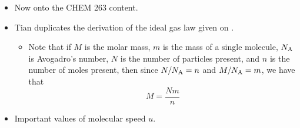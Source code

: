 \documentclass[../notes.tex]{subfiles}
\begin{document}
\begin{itemize}
\begin{itemize}
    \end{itemize}
    \item Now onto the CHEM 263 content.
    \item Tian duplicates the derivation of the ideal gas law given on \textcite[18-19]{bib:PHYS13300Notes}.
    \begin{itemize}
        \item Note that if $M$ is the molar mass, $m$ is the mass of a single molecule, $N_\text{A}$ is Avogadro's number, $N$ is the number of particles present, and $n$ is the number of moles present, then since $N/N_\text{A}=n$ and $M/N_\text{A}=m$, we have that
        \begin{equation*}
            M = \frac{Nm}{n}
        \end{equation*}
    \end{itemize}
    \item Important values of molecular speed $u$.
    \begin{figure}[h!]
        \centering
\end{figure}
\end{itemize}
\end{document}
